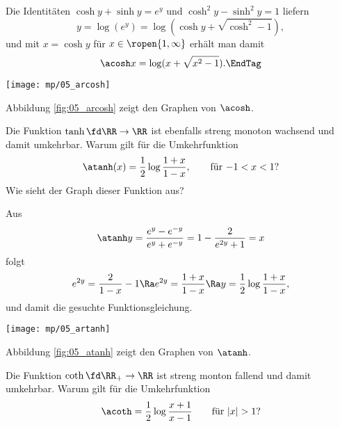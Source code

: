 \begin{antwort}
  Die Identitäten $\cosh y+\sinh y=e^y$ und 
  $\cosh^2 y-\sinh^2 y=1$ liefern 
  \[
  y=\log( e^y )= \log( \cosh y + \sqrt{ \cosh^2 -1 } ),
  \]
  und mit $x=\cosh y$ für $x\in\ropen{1,\infty}$ erhält man damit
  \begin{equation}
    \acosh x = \log( x + \sqrt{ x^2 -1 } ).\EndTag
  \end{equation}

  \begin{center}
    \texttt{[image: mp/05\_arcosh]}
    \label{fig:05_arcosh}
  \end{center}

  Abbildung \ref{fig:05_arcosh} zeigt den Graphen von $\acosh$.
\end{antwort}

\begin{frage}
  Die Funktion $\tanh \fd \RR\to \RR$ ist ebenfalls streng monoton 
  wachsend und damit umkehrbar. Warum gilt für die Umkehrfunktion 
  \[
  \atanh (x)= \frac{1}{2} \log \frac{1+x}{1-x}, \qquad\text{für $-1<x<1$?}
  \]
  Wie sieht der Graph dieser Funktion aus?
\end{frage}

\begin{antwort}
  Aus 
  \[
  \atanh y = \frac{e^{y}-e^{-y}}{e^y+e^{-y}} = 1-\frac{2}{e^{2y}+1} =x 
  \]
  folgt 
  \[
  e^{2y} = \frac{2}{1-x} -1 \Ra 
  e^{2y} = \frac{1+x}{1-x} \Ra
  y = \frac{1}{2} \log\frac{1+x}{1-x}, 
  \]
  \noindent
  und damit die gesuchte 
  Funktionsgleichung.\AntEnd

  \begin{center}
    \texttt{[image: mp/05\_artanh]}
    \label{fig:05_atanh}
  \end{center}

  Abbildung \ref{fig:05_atanh} zeigt den Graphen von $\atanh$.

\end{antwort}

\begin{frage}
  Die Funktion $\coth\fd \RR_+ \to \RR$ ist streng monton 
  fallend und damit umkehrbar. Warum gilt für die Umkehrfunktion
  \[
  \acoth = \frac{1}{2}\log \frac{x+1}{x-1} \qquad\text{für $|x|>1$?}
  \]
\end{frage}

